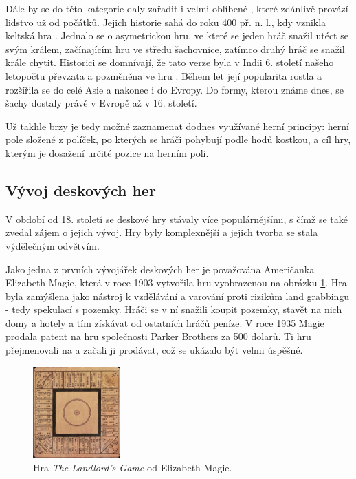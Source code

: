 Dále by se do této kategorie daly zařadit i velmi oblíbené \textbf{}, které zdánlivě provází lidstvo už od počátků. Jejich historie sahá do roku 400 př. n. l., kdy vznikla keltská hra . Jednalo se o asymetrickou hru, ve které se jeden hráč snažil utéct se svým králem, začínajícím hru ve středu šachovnice, zatímco druhý hráč se snažil krále chytit. Historici se domnívají, že tato verze byla v Indii 6. století našeho letopočtu převzata a pozměněna ve hru . Během let její popularita rostla a rozšířila se do celé Asie a nakonec i do Evropy. Do formy, kterou známe dnes, se šachy dostaly právě v Evropě až v 16. století. \cite{chess_com_2023}

Už takhle brzy je tedy možné zaznamenat dodnes využívané herní principy: herní pole složené z políček, po kterých se hráči pohybují podle hodů kostkou, a cíl hry, kterým je dosažení určité pozice na herním poli. \cite{attia_2018}

\subsection{Vývoj deskových her}
\label{subsec:development}

V období od 18. století se deskové hry stávaly více populárnějšími, s čímž se také zvedal zájem o jejich vývoj. Hry byly komplexnější a jejich tvorba se stala výdělečným odvětvím.

Jako jedna z prvních vývojářek deskových her je považována Američanka Elizabeth Magie, která v roce 1903 vytvořila hru  vyobrazenou na obrázku \ref{fig:landlords-game}. Hra byla zamýšlena jako nástroj k vzdělávání a varování proti rizikům land grabbingu - tedy spekulací s pozemky. Hráči se v ní snažili koupit pozemky, stavět na nich domy a hotely a tím získávat od ostatních hráčů peníze. V roce 1935 Magie prodala patent na hru společnosti Parker Brothers za 500 dolarů. Ti hru přejmenovali na \textbf{} a začali ji prodávat, což se ukázalo být velmi úspěšné. \cite{attia_2018}

\begin{figure}[h]
    \centering
    \includegraphics[width=0.3\textwidth]{figures/images/landlords-game.png}
    \caption{Hra \textit{The Landlord's Game} od Elizabeth Magie. \cite{attia_2018}}
    \label{fig:landlords-game}
\end{figure}

